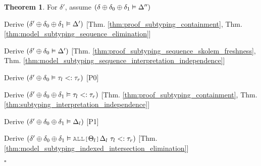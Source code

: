 \documentclass[acmsmall]{acmart}
\theoremstyle{definition}
\newtheorem{theorem}{Theorem}[section]
\begin{document}
\begin{theorem}
  \item \I \N For $\delta'$, assume $(
    \delta \oplus \delta_0 \oplus \delta_1 \vDash \Delta''
  )$


  \item \I\I \N Derive $(\delta' \oplus \delta_0 \oplus \delta_1 \vDash \Delta')$
    [Thm. \ref{thm:proof_subtyping_containment}, Thm. \ref{thm:model_subtyping_sequence_elimination}]
  \item \I\I \N Derive $(\delta' \oplus \delta_0 \vDash \Delta')$
    [Thm. \ref{thm:proof_subtyping_sequence_skolem_freshness}, Thm. \ref{thm:model_subtyping_sequence_interpretation_independence}]
  \item \I\I \N Derive $(
    \delta' \oplus \delta_0 \vDash \tau_l <: \tau_r
  )$ [P0]


  \item \I\I \N Derive $(
    \delta' \oplus \delta_0 \oplus \delta_1 \vDash \tau_l <: \tau_r
  )$ [Thm. \ref{thm:proof_subtyping_containment}, Thm. \ref{thm:subtyping_interpretation_independence}]


  \item \I\I \N Derive $(
    \delta' \oplus \delta_0 \oplus \delta_1 \vDash \Delta_l
  )$ [P1]

  \item \I\I \N Derive $(
    \delta' \oplus \delta_0 \oplus \delta_1 \satisfies \J{ALL[}\Theta_l\J{]}\Delta_l\ \tau_l \subtypes \tau_r
  )$ [Thm. \ref{thm:model_subtyping_indexed_intersection_elimination}]


  \noindent
  $\square$
\end{theorem}
\hfill
\end{document}
